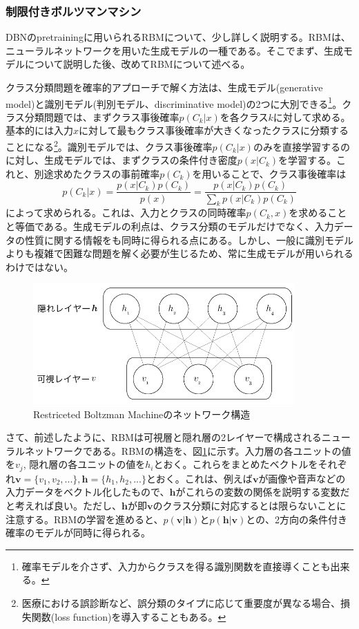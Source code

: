 \subsubsection{制限付きボルツマンマシン}
DBNのpretrainingに用いられるRBMについて、少し詳しく説明する。RBM\cite{rumelhart1986parallel}は、ニューラルネットワークを用いた生成モデルの一種である。そこでまず、生成モデルについて説明した後、改めてRBMについて述べる。\par
クラス分類問題を確率的アプローチで解く方法は、生成モデル(generative model)と識別モデル(判別モデル、discriminative model)の2つに大別できる\cite{bishop2006pattern}\footnote{確率モデルを介さず、入力からクラスを得る識別関数を直接導くことも出来る。}。クラス分類問題では、まずクラス事後確率$p(C_k|x)$を各クラス$k$に対して求める。基本的には入力$x$に対して最もクラス事後確率が大きくなったクラスに分類することになる\footnote{医療における誤診断など、誤分類のタイプに応じて重要度が異なる場合、損失関数(loss function)を導入することもある。}。識別モデルでは、クラス事後確率$p(C_k|x)$のみを直接学習するのに対し、生成モデルでは、まずクラスの条件付き密度$p(x|C_k)$を学習する。これと、別途求めたクラスの事前確率$p(C_k)$を用いることで、クラス事後確率は
\begin{equation}
p(C_k|x) = \frac{p(x | C_k)p(C_k)}{p(x)} = \frac{p(x | C_k)p(C_k)}{\sum_{k}p(x | C_k)p(C_k)}
\end{equation}
によって求められる。これは、入力とクラスの同時確率$p(C_k, x)$を求めることと等価である。生成モデルの利点は、クラス分類のモデルだけでなく、入力データの性質に関する情報をも同時に得られる点にある。しかし、一般に識別モデルよりも複雑で困難な問題を解く必要が生じるため、常に生成モデルが用いられるわけではない。\par
\begin{figure}[tbp]
 \centering
  \includegraphics[width=100mm]{img/c3/rbm}
 \caption{Restriceted Boltzman Machineのネットワーク構造}
 \label{c3_rbm}
\end{figure}
さて、前述したように、RBMは可視層と隠れ層の2レイヤーで構成されるニューラルネットワークである。RBMの構造を、図\ref{c3_rbm}に示す。入力層の各ユニットの値を$v_j$, 隠れ層の各ユニットの値を$h_i$とおく。これらをまとめたベクトルをそれぞれ$\bm{v}=\{v_1, v_2, ...\}, \bm{h}=\{h_1, h_2, ...\}$とおく。これは、例えば$\bm{v}$が画像や音声などの入力データをベクトル化したもので、$\bm{h}$がこれらの変数の関係を説明する変数だと考えれば良い。ただし、$\bm{h}$が即$\bm{v}$のクラス分類に対応するとは限らないことに注意する。RBMの学習を進めると、$p(\bm{v}|\bm{h})$と$p(\bm{h}|\bm{v})$との、2方向の条件付き確率のモデルが同時に得られる。\par
